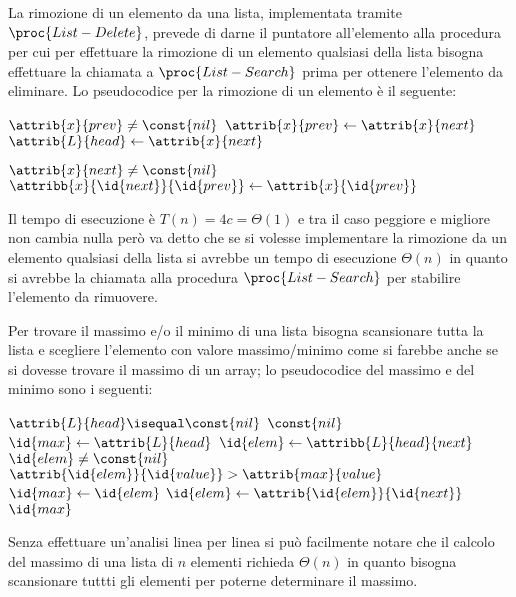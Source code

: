 La rimozione di un elemento da una lista, implementata tramite $\proc{List-Delete}$, prevede di darne il puntatore all'elemento alla procedura per cui per effettuare
la rimozione di un elemento qualsiasi della lista bisogna effettuare la chiamata a $\proc{List-Search}$ prima per ottenere l'elemento da eliminare.\newline
Lo pseudocodice per la rimozione di un elemento è il seguente:
\begin{codebox}
\li \If $\attrib{x}{prev} \neq \const{nil}$
    \Then
\li              $\attrib{x}{prev} \gets \attrib{x}{next}$
    \End
\li \Else        $\attrib{L}{head} \gets \attrib{x}{next}$

\li \If $\attrib{x}{next} \neq \const{nil}$
    \Then
\li              $\attribb{x}{\id{next}}{\id{prev}} \gets \attrib{x}{\id{prev}}$
    \End
\end{codebox}
Il tempo di esecuzione è $T(n) = 4c = \Theta(1)$ e tra il caso peggiore e migliore non cambia
nulla però va detto che se si volesse implementare la rimozione da un elemento qualsiasi
della lista si avrebbe un tempo di esecuzione $\Theta(n)$ in quanto si avrebbe la chiamata
alla procedura $\proc{List-Search}$ per stabilire l'elemento da rimuovere.

Per trovare il massimo e/o il minimo di una lista bisogna scansionare tutta la lista
e scegliere l'elemento con valore massimo/minimo come si farebbe anche se si dovesse
trovare il massimo di un array; lo pseudocodice del massimo e del minimo sono i seguenti:
\begin{codebox}
\li \If $\attrib{L}{head} \isequal \const{nil}$
    \Then
\li                \Return $\const{nil}$
\li $\id{max} \gets \attrib{L}{head}$
\li $\id{elem} \gets \attribb{L}{head}{next}$
\li \While $\id{elem} \neq \const{nil}$
    \Do
\li                 \If $\attrib{\id{elem}}{\id{value}} > \attrib{max}{value}$
                    \Then
\li                              $\id{max} \gets \id{elem}$
                    \End
\li                 $\id{elem} \gets \attrib{\id{elem}}{\id{next}}$
    \End
\li \Return $\id{max}$
\end{codebox}
Senza effettuare un'analisi linea per linea si può facilmente notare che il calcolo
del massimo di una lista di $n$ elementi richieda $\Theta(n)$ in quanto bisogna
scansionare tuttti gli elementi per poterne determinare il massimo.


